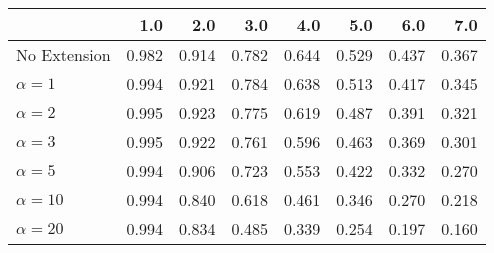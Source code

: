 \begin{tabular}{lrrrrrrr}
\toprule
{} &   1.0 &   2.0 &   3.0 &   4.0 &   5.0 &   6.0 &   7.0 \\
\midrule
No Extension  & 0.982 & 0.914 & 0.782 & 0.644 & 0.529 & 0.437 & 0.367 \\
$\alpha = 1$  & 0.994 & 0.921 & 0.784 & 0.638 & 0.513 & 0.417 & 0.345 \\
$\alpha = 2$  & 0.995 & 0.923 & 0.775 & 0.619 & 0.487 & 0.391 & 0.321 \\
$\alpha = 3$  & 0.995 & 0.922 & 0.761 & 0.596 & 0.463 & 0.369 & 0.301 \\
$\alpha = 5$  & 0.994 & 0.906 & 0.723 & 0.553 & 0.422 & 0.332 & 0.270 \\
$\alpha = 10$ & 0.994 & 0.840 & 0.618 & 0.461 & 0.346 & 0.270 & 0.218 \\
$\alpha = 20$ & 0.994 & 0.834 & 0.485 & 0.339 & 0.254 & 0.197 & 0.160 \\
\bottomrule
\end{tabular}
